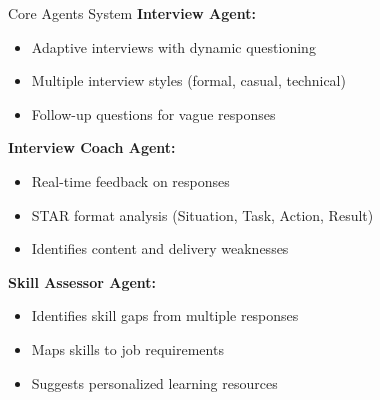 \documentclass{beamer}
\begin{document}
\begin{frame}{Core Agents System}
\small
\textbf{Interview Agent:}
\begin{itemize}
    \item Adaptive interviews with dynamic questioning
    \item Multiple interview styles (formal, casual, technical)
    \item Follow-up questions for vague responses
\end{itemize}

\vspace{6pt}

\textbf{Interview Coach Agent:}
\begin{itemize}
    \item Real-time feedback on responses
    \item STAR format analysis (Situation, Task, Action, Result)
    \item Identifies content and delivery weaknesses
\end{itemize}

\vspace{6pt}

\textbf{Skill Assessor Agent:}
\begin{itemize}
    \item Identifies skill gaps from multiple responses
    \item Maps skills to job requirements
    \item Suggests personalized learning resources
\end{itemize}
\end{frame}
\end{document}
